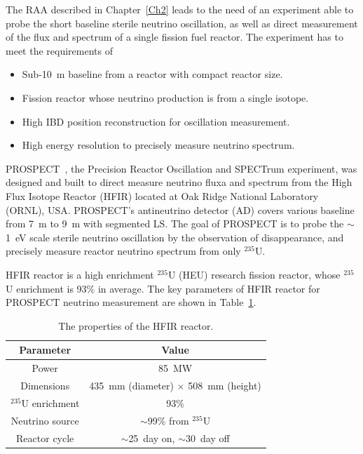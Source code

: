     
    The RAA described in Chapter~\ref{Ch2} leads to the need of an experiment able to probe the short baseline sterile neutrino oscillation, as well as direct measurement of the flux and spectrum of a single fission fuel reactor. 
    The experiment has to meet the requirements of 
    \begin{itemize}
        \item Sub-10~m baseline from a reactor with compact reactor size. 
        \item Fission reactor whose neutrino production is from a single isotope.
        \item High IBD position reconstruction for oscillation measurement.
        \item High energy resolution to precisely measure neutrino spectrum.
    \end{itemize}
    
    PROSPECT~\cite{bib:prospect_physics, bib:prospect_nim}, the Precision Reactor Oscillation and SPECTrum experiment, was designed and built to direct measure neutrino fluxa and spectrum from the High Flux Isotope Reactor (HFIR) located at Oak Ridge National Laboratory (ORNL), USA. 
    PROSPECT's antineutrino detector (AD) covers various baseline from 7~m to 9~m with segmented LS.
    The goal of PROSPECT is to probe the $\sim$1~eV scale sterile neutrino oscillation by the observation of \nuebar disappearance, and precisely measure reactor neutrino spectrum from only $^{235}$U.
    

    HFIR reactor is a high enrichment $^{235}$U (HEU) research fission reactor, whose $^{235}$U enrichment is 93\% in average.
    The key parameters of HFIR reactor for PROSPECT neutrino measurement are shown in Table~\ref{tab:HFIR}.
\begin{table}[h]
    \centering
    \caption[HFIR parameters]{The properties of the HFIR reactor.}
    \begin{tabular}{cc}
    \hline
    \hline
    Parameter  & Value   \\
    \hline
    Power    & 85~MW \\
    Dimensions     & 435~mm (diameter) $\times$ 508~mm (height) \\
    $^{235}$U enrichment & 93\% \\
    Neutrino source & $\sim$99\% from $^{235}$U \\
    Reactor cycle & $\sim$25~day on, $\sim$30~day off \\
    \hline
    \end{tabular}

\label{tab:HFIR}
\end{table}

